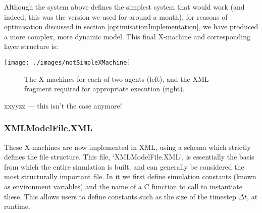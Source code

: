 \documentclass[11pt,a4paper]{article}
\begin{document}
\noindent Although the system above defines the simplest system that would work (and indeed, this was the version we used for around a month), for reasons of optimisation discussed in section \ref{optimisationImplementation}, we have produced a more complex, more dynamic model. This final X-machine and corresponding layer structure is:

\texttt{[image: ./images/notSimpleXMachine]}
\begin{figure}[h!]
\caption[Final, implemented X-machine]{The X-machines for each of two agents (left), and the XML fragment required for appropriate execution (right).}
\end{figure}

xxyyzz --- this isn't the case anymore!
\subsubsection{XMLModelFile.XML}
\label{xmlModelFileDesign}
These X-machines are now implemented in XML, using a schema which strictly defines the file structure. This file, `XMLModelFile.XML', is essentially the basis from which the entire simulation is built, and can generally be considered the most structurally important file. In it we first define simulation constants (known as environment variables) and the name of a C function to call to instantiate these. This allows users to define constants such as the size of the timestep $\Delta t$, at runtime.
\end{document}

